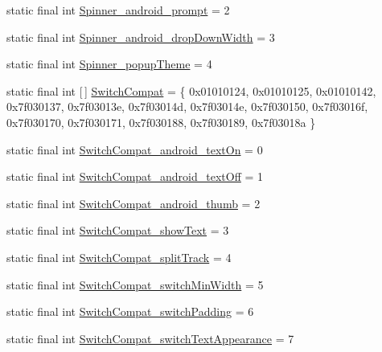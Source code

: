 \begin{DoxyCompactItemize}
\item 
static final int \mbox{\hyperlink{classcom_1_1google_1_1android_1_1gms_1_1R_1_1styleable_a45ab8f94ba42dce631d7ec0ee527bc15}{Spinner\+\_\+android\+\_\+prompt}} = 2
\item 
static final int \mbox{\hyperlink{classcom_1_1google_1_1android_1_1gms_1_1R_1_1styleable_a573a2d8f0c3db9501b2593661203fdcf}{Spinner\+\_\+android\+\_\+drop\+Down\+Width}} = 3
\item 
static final int \mbox{\hyperlink{classcom_1_1google_1_1android_1_1gms_1_1R_1_1styleable_a675de4aae962a60711254c2b0e933594}{Spinner\+\_\+popup\+Theme}} = 4
\item 
static final int \mbox{[}$\,$\mbox{]} \mbox{\hyperlink{classcom_1_1google_1_1android_1_1gms_1_1R_1_1styleable_a2514b6e618d49f6aa5ca4a0139b2f84c}{Switch\+Compat}} = \{ 0x01010124, 0x01010125, 0x01010142, 0x7f030137, 0x7f03013e, 0x7f03014d, 0x7f03014e, 0x7f030150, 0x7f03016f, 0x7f030170, 0x7f030171, 0x7f030188, 0x7f030189, 0x7f03018a \}
\item 
static final int \mbox{\hyperlink{classcom_1_1google_1_1android_1_1gms_1_1R_1_1styleable_a5c2e33d5cc161e84d1d509888d8e582d}{Switch\+Compat\+\_\+android\+\_\+text\+On}} = 0
\item 
static final int \mbox{\hyperlink{classcom_1_1google_1_1android_1_1gms_1_1R_1_1styleable_a96fcea5cf0ad98c64f5e224504118a90}{Switch\+Compat\+\_\+android\+\_\+text\+Off}} = 1
\item 
static final int \mbox{\hyperlink{classcom_1_1google_1_1android_1_1gms_1_1R_1_1styleable_a90e925dafdba8686ffeca836cea39f0f}{Switch\+Compat\+\_\+android\+\_\+thumb}} = 2
\item 
static final int \mbox{\hyperlink{classcom_1_1google_1_1android_1_1gms_1_1R_1_1styleable_a4fab421a38e6a66a3e426d9650f2620c}{Switch\+Compat\+\_\+show\+Text}} = 3
\item 
static final int \mbox{\hyperlink{classcom_1_1google_1_1android_1_1gms_1_1R_1_1styleable_a475cd71d855457ce8a63098077999460}{Switch\+Compat\+\_\+split\+Track}} = 4
\item 
static final int \mbox{\hyperlink{classcom_1_1google_1_1android_1_1gms_1_1R_1_1styleable_ae2fe2833b8a424269b221638f5a3a9bf}{Switch\+Compat\+\_\+switch\+Min\+Width}} = 5
\item 
static final int \mbox{\hyperlink{classcom_1_1google_1_1android_1_1gms_1_1R_1_1styleable_ac9dbe1bc50e584c26330ed6e06a98adb}{Switch\+Compat\+\_\+switch\+Padding}} = 6
\item 
static final int \mbox{\hyperlink{classcom_1_1google_1_1android_1_1gms_1_1R_1_1styleable_addffe1df4e18b548f716a38a0d0afd56}{Switch\+Compat\+\_\+switch\+Text\+Appearance}} = 7

\end{DoxyCompactItemize}
